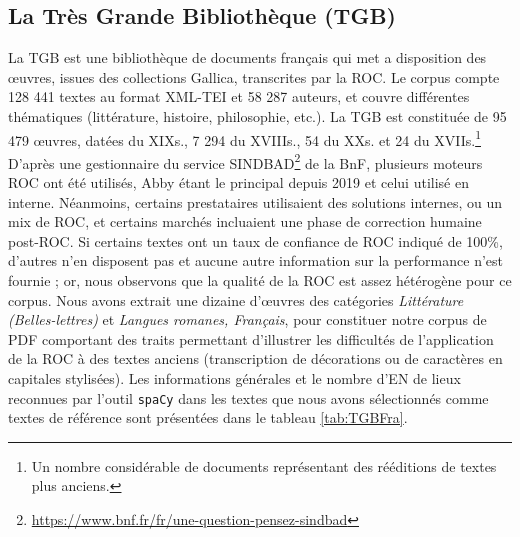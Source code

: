\subsection{La Très Grande Bibliothèque (TGB)}
La TGB est une bibliothèque de documents français qui met a disposition des œuvres, issues des collections Gallica, transcrites par la ROC. Le corpus compte 128 441 textes au format XML-TEI et 58 287 auteurs, et couvre différentes thématiques (littérature, histoire, philosophie, etc.). La TGB est constituée de 95 479 œuvres, datées du XIX\ieme{}s., 7 294 du XVIII\ieme{}s., 54 du XX\ieme{}s. et 24 du XVII\ieme{}s.\footnote{Un nombre considérable de documents représentant des rééditions de textes plus anciens.} 
D'après une gestionnaire du service SINDBAD\footnote{\url{https://www.bnf.fr/fr/une-question-pensez-sindbad}} de la BnF, plusieurs moteurs ROC ont été utilisés, Abby étant le principal depuis 2019 et celui utilisé en interne. Néanmoins, certains prestataires utilisaient des solutions internes, ou un mix de ROC, et certains marchés incluaient une phase de correction humaine post-ROC. Si certains textes ont un taux de confiance de ROC indiqué de 100\%, d'autres n'en disposent pas et aucune autre information sur la performance n'est fournie ; or, nous observons que la qualité de la ROC est assez hétérogène pour ce corpus. Nous avons extrait une dizaine d'œuvres des catégories \textit{Littérature (Belles-lettres)} et \textit{Langues romanes, Français}, pour constituer notre corpus de PDF comportant des traits permettant d'illustrer les difficultés de l'application de la ROC à des textes anciens (transcription de décorations ou de caractères en capitales stylisées). Les informations générales et le nombre d'EN de lieux reconnues par l'outil \texttt{spaCy} dans les textes que nous avons sélectionnés comme textes de référence sont présentées dans le tableau \ref{tab:TGBFra}.
